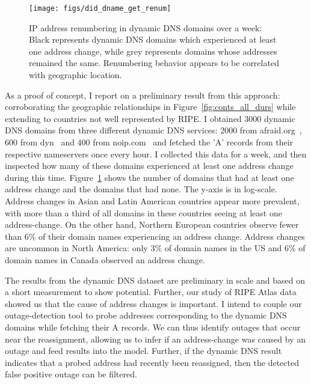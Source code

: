 \begin{figure}[tb]
\begin{center}
\texttt{[image: figs/did\_dname\_get\_renum]}
\end{center}
\caption{\label{fig:addr_change_per_ctry}
IP address renumbering in dynamic DNS domains over a week: Black
represents dynamic DNS domains which experienced at least one address
change, while grey represents domains whose addresses remained the
same. Renumbering behavior appears to be correlated with geographic
location.}
\end{figure}

As a proof of concept, I report on a preliminary result from this
approach: corroborating the geographic relationships in Figure~\ref{fig:conts_all_durs} 
while extending to countries not well represented by RIPE.
I
obtained 3000 dynamic DNS domains from three different dynamic DNS
services: 2000 from afraid.org~\cite{afraid}, 600 from dyn~\cite{dyn} and 400 from
noip.com~\cite{noip} and fetched the 'A' records from their respective
nameservers once every hour. I collected this data for a week, and
then inspected how many of these domains experienced at least one
address change during this time. Figure~\ref{fig:addr_change_per_ctry}
shows the number of domains that had at least one 
address change and the domains that had none. The y-axis is in log-scale. 
Address changes in Asian and Latin American countries appear
more prevalent, with more than a third of all domains in these
countries seeing at least one address-change. On the other hand,
Northern European countries observe fewer than 6\% of their domain names
experiencing an address change. Address changes are uncommon in
North America: only 3\% of domain names in the US and 6\% of domain
names in Canada observed an address change.

The results from the dynamic DNS dataset are preliminary in
scale and based on a short measurement to show potential.
Further, our study of RIPE Atlas data showed us that the cause of
address changes is important. I intend to couple our
outage-detection tool to probe addresses corresponding to
the dynamic DNS domains while fetching their A records.  We
can thus identify outages that occur near the reassignment,
allowing us to infer if an address-change was caused by an outage and
feed results into the model. Further, if the dynamic DNS result
indicates that a probed address had recently been reassigned, then the
detected false positive outage can be filtered.
 
